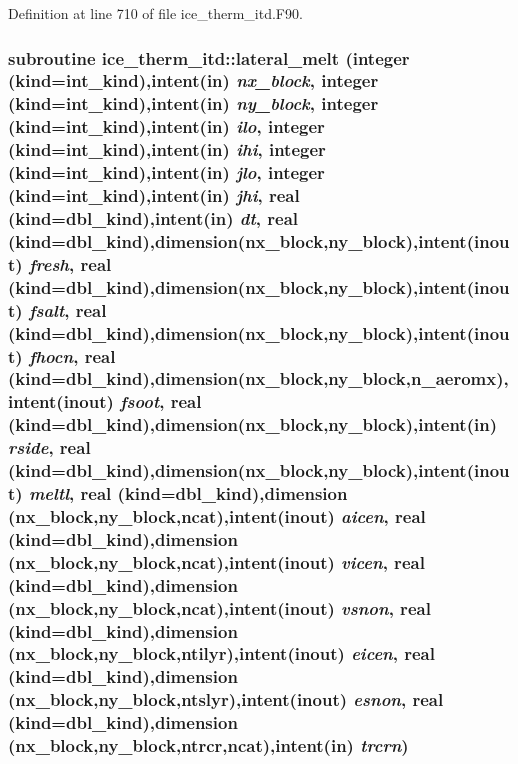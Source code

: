 Definition at line 710 of file ice\_\-therm\_\-itd.F90.\hypertarget{namespaceice__therm__itd_a31484de362b540a7b089bea7e7cc8e81}{
\subsubsection[{lateral\_\-melt}]{\setlength{\rightskip}{0pt plus 5cm}subroutine ice\_\-therm\_\-itd::lateral\_\-melt (integer (kind=int\_\-kind),intent(in) {\em nx\_\-block}, \/  integer (kind=int\_\-kind),intent(in) {\em ny\_\-block}, \/  integer (kind=int\_\-kind),intent(in) {\em ilo}, \/  integer (kind=int\_\-kind),intent(in) {\em ihi}, \/  integer (kind=int\_\-kind),intent(in) {\em jlo}, \/  integer (kind=int\_\-kind),intent(in) {\em jhi}, \/  real (kind=dbl\_\-kind),intent(in) {\em dt}, \/  real (kind=dbl\_\-kind),dimension(nx\_\-block,ny\_\-block),intent(inout) {\em fresh}, \/  real (kind=dbl\_\-kind),dimension(nx\_\-block,ny\_\-block),intent(inout) {\em fsalt}, \/  real (kind=dbl\_\-kind),dimension(nx\_\-block,ny\_\-block),intent(inout) {\em fhocn}, \/  real (kind=dbl\_\-kind),dimension(nx\_\-block,ny\_\-block,n\_\-aeromx),intent(inout) {\em fsoot}, \/  real (kind=dbl\_\-kind),dimension(nx\_\-block,ny\_\-block),intent(in) {\em rside}, \/  real (kind=dbl\_\-kind),dimension(nx\_\-block,ny\_\-block),intent(inout) {\em meltl}, \/  real (kind=dbl\_\-kind),dimension (nx\_\-block,ny\_\-block,ncat),intent(inout) {\em aicen}, \/  real (kind=dbl\_\-kind),dimension (nx\_\-block,ny\_\-block,ncat),intent(inout) {\em vicen}, \/  real (kind=dbl\_\-kind),dimension (nx\_\-block,ny\_\-block,ncat),intent(inout) {\em vsnon}, \/  real (kind=dbl\_\-kind),dimension (nx\_\-block,ny\_\-block,ntilyr),intent(inout) {\em eicen}, \/  real (kind=dbl\_\-kind),dimension (nx\_\-block,ny\_\-block,ntslyr),intent(inout) {\em esnon}, \/  real (kind=dbl\_\-kind),dimension (nx\_\-block,ny\_\-block,ntrcr,ncat),intent(in) {\em trcrn})}}
\label{namespaceice__therm__itd_a31484de362b540a7b089bea7e7cc8e81}



